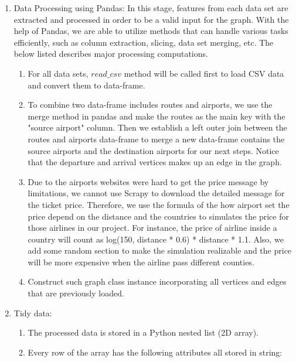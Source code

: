\documentclass[fontsize=11pt]{article}
\begin{document}
\begin{enumerate}
\begin{enumerate}
        \item Data Processing using Pandas: 
        In this stage, features from each data set are extracted and processed in order to be a valid input for the graph. With the help of Pandas, we are able to utilize methods that can handle various tasks efficiently, such as column extraction, slicing, data set merging, etc. The below listed describes major processing computations.
        \begin{enumerate}
            \item For all data sets, $read\_csv$ method will be called first to load CSV data and convert them to data-frame.
            \item To combine two data-frame includes routes and airports, we use the merge method in pandas and make the routes as the main key with the "source airport" column. Then we establish a left outer join between the routes and airports data-frame to merge a new data-frame contains the source airports and the destination airports for our next steps. Notice that the departure and arrival vertices makes up an edge in the graph.
            \item Due to the airports websites were hard to get the price message by limitations, we cannot use Scrapy to download the detailed message for the ticket price. Therefore, we use the formula of the how airport set the price depend on the distance and the countries to simulates the price for those airlines in our project. For instance, the price of airline inside a country will count as log(150, distance * 0.6) * distance * 1.1. Also, we add some random section to make the simulation realizable and the price will be more expensive when the airline pass different counties. 
            \item Construct such graph class instance incorporating all vertices and edges that are previously loaded.
        \end{enumerate}
        \item Tidy data:
            \begin{enumerate}
                \item The processed data is stored in a Python nested list (2D array).
                \item Every row of the array has the following attributes all stored in string:
                

\end{enumerate}
\end{enumerate}
\end{enumerate}
\end{document}
